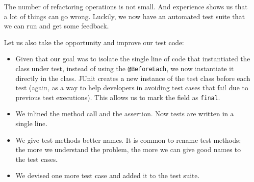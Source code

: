 The number of refactoring operations is not small. And experience shows
us that a lot of things can go wrong. Luckily, we now have an automated
test suite that we can run and get some feedback.

Let us also take the opportunity and improve our test code:

\begin{itemize}
\tightlist
\item
  Given that our goal was to isolate the single line of code that
  instantiated the class under test, instead of using the
  \texttt{@BeforeEach}, we now instantiate it directly in the class.
  JUnit creates a new instance of the test class before each test
  (again, as a way to help developers in avoiding test cases that fail
  due to previous test executions). This allows us to mark the field as
  \texttt{final}.
\item
  We inlined the method call and the assertion. Now tests are written in
  a single line.
\item
  We give test methods better names. It is common to rename test
  methods; the more we understand the problem, the more we can give good
  names to the test cases.
\item
  We devised one more test case and added it to the test suite.
\end{itemize}

